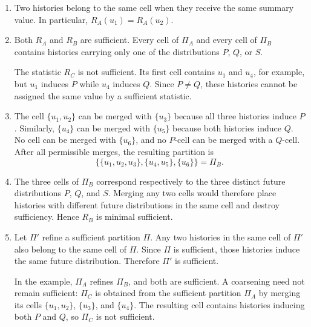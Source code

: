 \begin{solution}[ex:p2-1]
    \begin{enumerate}
      \item Two histories belong to the same cell when they receive
        the same summary value. In particular,
        $R_A(u_1)=R_A(u_2)$.

      \item Both $R_A$ and $R_B$ are sufficient. Every cell of $\Pi_A$ and
        every cell of $\Pi_B$ contains histories carrying only one of the
        distributions $P$, $Q$, or $S$.

        The statistic $R_C$ is not sufficient. Its first cell contains $u_1$
        and $u_4$, for example, but $u_1$ induces $P$ while $u_4$ induces $Q$.
        Since $P\neq Q$, these histories cannot be assigned the same value by
        a sufficient statistic.

      \item The cell $\{u_1,u_2\}$ can be merged with $\{u_3\}$ because all
        three histories induce $P$. Similarly, $\{u_4\}$ can be merged with
        $\{u_5\}$ because both histories induce $Q$. No cell can be merged
        with $\{u_6\}$, and no $P$-cell can be merged with a $Q$-cell. After
        all permissible merges, the resulting partition is
        \[
          \bigl\{\{u_1,u_2,u_3\},\{u_4,u_5\},\{u_6\}\bigr\}=\Pi_B.
        \]

      \item The three cells of $\Pi_B$ correspond respectively to the three
        distinct future distributions $P$, $Q$, and $S$. Merging any two cells
        would therefore place histories with different future distributions
        in the same cell and destroy sufficiency. Hence $R_B$ is minimal
        sufficient.

      \item Let $\Pi'$ refine a sufficient partition $\Pi$. Any two histories
        in the same cell of $\Pi'$ also belong to the same cell of $\Pi$.
        Since $\Pi$ is sufficient, those histories induce the same future
        distribution. Therefore $\Pi'$ is sufficient.

        In the example, $\Pi_A$ refines $\Pi_B$, and both are sufficient. A
        coarsening need not remain sufficient: $\Pi_C$ is obtained from the
        sufficient partition $\Pi_A$ by merging its cells
        $\{u_1,u_2\}$, $\{u_3\}$, and $\{u_4\}$. The resulting cell contains
        histories inducing both $P$ and $Q$, so $\Pi_C$ is not sufficient.


\end{enumerate}
\end{solution}
